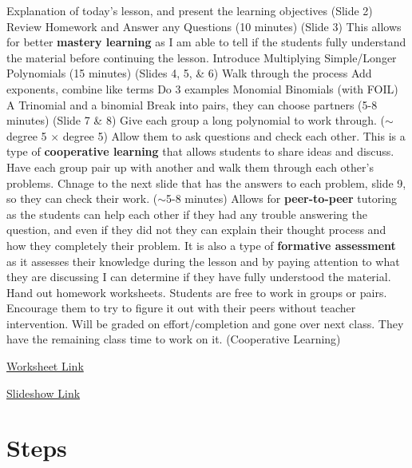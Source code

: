 \begin{outline}
    \1 Explanation of today's lesson, and present the learning objectives (Slide 2)
    \1 Review Homework and Answer any Questions (10 minutes) (Slide 3)
        \2 This allows for better \textbf{mastery learning} as I am able to tell if the students fully understand the material before continuing the lesson.
    \1 Introduce Multiplying Simple/Longer Polynomials (15 minutes) (Slides 4, 5, \& 6)
        \2 Walk through the process
        \2 Add exponents, combine like terms
        \2 Do 3 examples
            \3 Monomial
            \3 Binomials (with FOIL)
            \3 A Trinomial and a binomial
    \1 Break into pairs, they can choose partners (5-8 minutes) (Slide 7 \& 8)
        \2 Give each group a long polynomial to work through. ($\sim$degree 5 $\times$ degree 5)
        \2 Allow them to ask questions and check each other.
            \3 This is a type of \textbf{cooperative learning} that allows students to share ideas and discuss.
    \1 Have each group pair up with another and walk them through each other's problems. Chnage to the next slide that has the answers to each problem, slide 9, so they can check their work. ($\sim$5-8 minutes)
        \2 Allows for \textbf{peer-to-peer} tutoring as the students can help each other if they had any trouble answering the question, and even if they did not they can explain their thought process and how they completely their problem. It is also a type of \textbf{formative assessment} as it assesses their knowledge during the lesson and by paying attention to what they are discussing I can determine if they have fully understood the material.
    \1 Hand out homework worksheets. Students are free to work in groups or pairs. Encourage them to try to figure it out with their peers without teacher intervention. Will be graded on effort/completion and gone over next class. They have the remaining class time to work on it. (Cooperative Learning)
\end{outline}

\href{LINK}{Worksheet Link}

\href{https://www.canva.com/design/DAF0BNXNsS0/tsfpypAb2t-n2v5nL9Hqkw/edit?utm_content=DAF0BNXNsS0&utm_campaign=designshare&utm_medium=link2&utm_source=sharebutton}{Slideshow Link}

\section{Steps}

